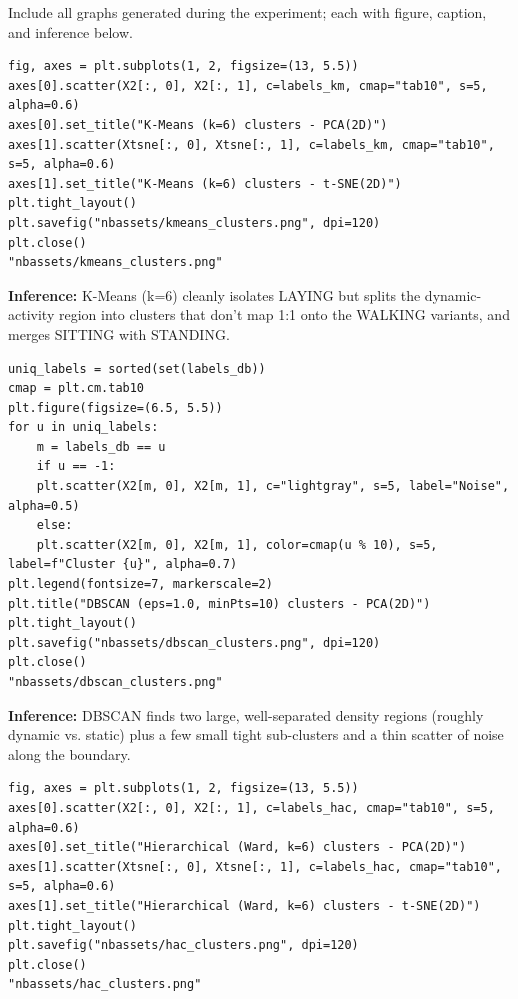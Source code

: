 \documentclass[12pt,a4paper]{article}
\begin{document}
Include all graphs generated during the experiment; each with figure,
caption, and inference below.

\begin{verbatim}
fig, axes = plt.subplots(1, 2, figsize=(13, 5.5))
axes[0].scatter(X2[:, 0], X2[:, 1], c=labels_km, cmap="tab10", s=5, alpha=0.6)
axes[0].set_title("K-Means (k=6) clusters - PCA(2D)")
axes[1].scatter(Xtsne[:, 0], Xtsne[:, 1], c=labels_km, cmap="tab10", s=5, alpha=0.6)
axes[1].set_title("K-Means (k=6) clusters - t-SNE(2D)")
plt.tight_layout()
plt.savefig("nbassets/kmeans_clusters.png", dpi=120)
plt.close()
"nbassets/kmeans_clusters.png"
\end{verbatim}

\url{}

\textbf{Inference:} K-Means (k=6) cleanly isolates LAYING but splits the dynamic-
activity region into clusters that don't map 1:1 onto the WALKING
variants, and merges SITTING with STANDING.

\begin{verbatim}
uniq_labels = sorted(set(labels_db))
cmap = plt.cm.tab10
plt.figure(figsize=(6.5, 5.5))
for u in uniq_labels:
    m = labels_db == u
    if u == -1:
	plt.scatter(X2[m, 0], X2[m, 1], c="lightgray", s=5, label="Noise", alpha=0.5)
    else:
	plt.scatter(X2[m, 0], X2[m, 1], color=cmap(u % 10), s=5, label=f"Cluster {u}", alpha=0.7)
plt.legend(fontsize=7, markerscale=2)
plt.title("DBSCAN (eps=1.0, minPts=10) clusters - PCA(2D)")
plt.tight_layout()
plt.savefig("nbassets/dbscan_clusters.png", dpi=120)
plt.close()
"nbassets/dbscan_clusters.png"
\end{verbatim}

\url{}

\textbf{Inference:} DBSCAN finds two large, well-separated density regions
(roughly dynamic vs. static) plus a few small tight sub-clusters and a
thin scatter of noise along the boundary.

\begin{verbatim}
fig, axes = plt.subplots(1, 2, figsize=(13, 5.5))
axes[0].scatter(X2[:, 0], X2[:, 1], c=labels_hac, cmap="tab10", s=5, alpha=0.6)
axes[0].set_title("Hierarchical (Ward, k=6) clusters - PCA(2D)")
axes[1].scatter(Xtsne[:, 0], Xtsne[:, 1], c=labels_hac, cmap="tab10", s=5, alpha=0.6)
axes[1].set_title("Hierarchical (Ward, k=6) clusters - t-SNE(2D)")
plt.tight_layout()
plt.savefig("nbassets/hac_clusters.png", dpi=120)
plt.close()
"nbassets/hac_clusters.png"
\end{verbatim}
\end{document}
